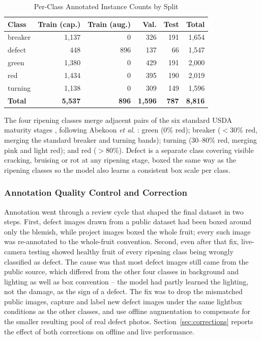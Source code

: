 \documentclass[journal]{IEEEtran}
\begin{document}
\begin{table}[!t]
\caption{Per-Class Annotated Instance Counts by Split}
\label{tab:instances}
\centering
\begin{tabular}{lrrrrr}
\toprule
\textbf{Class} & \textbf{Train (cap.)} & \textbf{Train (aug.)} & \textbf{Val.} & \textbf{Test} & \textbf{Total} \\
\midrule
breaker & 1{,}137 & 0   & 326 & 191 & 1{,}654 \\
defect  & 448   & 896 & 137 & 66  & 1{,}547 \\
green   & 1{,}380 & 0   & 429 & 191 & 2{,}000 \\
red     & 1{,}434 & 0   & 395 & 190 & 2{,}019 \\
turning & 1{,}138 & 0   & 309 & 149 & 1{,}596 \\
\midrule
\textbf{Total} & \textbf{5{,}537} & \textbf{896} & \textbf{1{,}596} & \textbf{787} & \textbf{8{,}816} \\
\bottomrule
\end{tabular}
\end{table}

The four ripening classes merge adjacent pairs of the six standard USDA maturity stages \cite{usda1991}, following Abekoon \textit{et al.} \cite{abekoon2024}: green (0\% red); breaker ($<$30\% red, merging the standard breaker and turning bands); turning (30--80\% red, merging pink and light red); and red ($>$80\%). Defect is a separate class covering visible cracking, bruising or rot at any ripening stage, boxed the same way as the ripening classes so the model also learns a consistent box scale per class.

\subsubsection{Annotation Quality Control and Correction}
\label{sec:qc}
Annotation went through a review cycle that shaped the final dataset in two steps. First, defect images drawn from a public dataset had been boxed around only the blemish, while project images boxed the whole fruit; every such image was re-annotated to the whole-fruit convention. Second, even after that fix, live-camera testing showed healthy fruit of every ripening class being wrongly classified as defect. The cause was that most defect images still came from the public source, which differed from the other four classes in background and lighting as well as box convention -- the model had partly learned the lighting, not the damage, as the sign of a defect. The fix was to drop the mismatched public images, capture and label new defect images under the same lightbox conditions as the other classes, and use offline augmentation to compensate for the smaller resulting pool of real defect photos. Section~\ref{sec:corrections} reports the effect of both corrections on offline and live performance.
\end{document}
